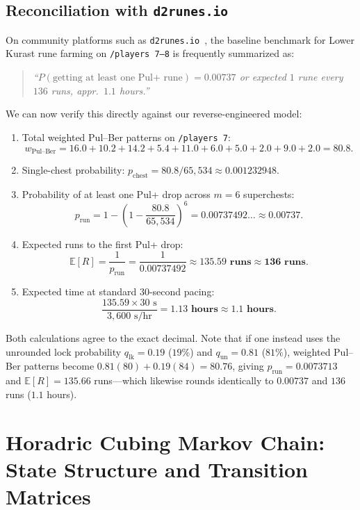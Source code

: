 \documentclass[11pt,reqno]{amsart}
\theoremstyle{definition}
\begin{document}
\subsection*{Reconciliation with \texttt{d2runes.io}}
On community platforms such as \texttt{d2runes.io}~\cite{thehappydev_d2runes}, the baseline benchmark for Lower Kurast rune farming on \texttt{/players~7--8} is frequently summarized as:
\begin{quote}
\emph{``$P(\text{getting at least one Pul+ rune}) = 0.00737$ or expected $1$ rune every $136$ runs, appr.\ $1.1$ hours.''}
\end{quote}
We can now verify this directly against our reverse-engineered model:
\begin{enumerate}
    \item Total weighted Pul--Ber patterns on \texttt{/players~7}:
    \[
        w_{\text{Pul--Ber}} = 16.0 + 10.2 + 14.2 + 5.4 + 11.0 + 6.0 + 5.0 + 2.0 + 9.0 + 2.0 = \mathbf{80.8}.
    \]
    \item Single-chest probability: $p_{\text{chest}} = 80.8 / 65{,}534 \approx 0.001232948$.
    \item Probability of at least one Pul+ drop across $m = 6$ superchests:
    \[
        p_{\text{run}} = 1 - \left(1 - \frac{80.8}{65{,}534}\right)^6 = \mathbf{0.00737492\dots} \approx \mathbf{0.00737}.
    \]
    \item Expected runs to the first Pul+ drop:
    \[
        \mathbb{E}[R] = \frac{1}{p_{\text{run}}} = \frac{1}{0.00737492} \approx \mathbf{135.59\text{ runs}} \approx \mathbf{136\text{ runs}}.
    \]
    \item Expected time at standard $30$-second pacing:
    \[
        \frac{135.59 \times 30\text{ s}}{3{,}600\text{ s/hr}} = \mathbf{1.13\text{ hours}} \approx \mathbf{1.1\text{ hours}}.
    \]
\end{enumerate}
Both calculations agree to the exact decimal. Note that if one instead uses the unrounded lock probability $q_{\text{lk}} = 0.19$ ($19\%$) and $q_{\text{un}} = 0.81$ ($81\%$), weighted Pul--Ber patterns become $0.81(80) + 0.19(84) = 80.76$, giving $p_{\text{run}} = 0.0073713$ and $\mathbb{E}[R] = 135.66$ runs—which likewise rounds identically to $0.00737$ and $136$ runs ($1.1$ hours).

\section{Horadric Cubing Markov Chain: State Structure and Transition Matrices}
\label{app:markov_chain}
\end{document}
